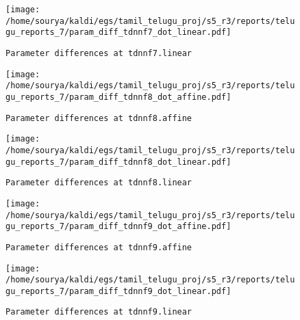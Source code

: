 \documentclass[prl,10pt,twocolumn]{revtex4}
\begin{document}
\newpage
\begin{figure}[h]
  \begin{center}
    \caption{\texttt{Parameter differences at tdnnf7.linear}}
    \texttt{[image: /home/sourya/kaldi/egs/tamil\_telugu\_proj/s5\_r3/reports/telugu\_reports\_7/param\_diff\_tdnnf7\_dot\_linear.pdf]}
  \end{center}
\end{figure}
\clearpage


\newpage
\begin{figure}[h]
  \begin{center}
    \caption{\texttt{Parameter differences at tdnnf8.affine}}
    \texttt{[image: /home/sourya/kaldi/egs/tamil\_telugu\_proj/s5\_r3/reports/telugu\_reports\_7/param\_diff\_tdnnf8\_dot\_affine.pdf]}
  \end{center}
\end{figure}
\clearpage


\newpage
\begin{figure}[h]
  \begin{center}
    \caption{\texttt{Parameter differences at tdnnf8.linear}}
    \texttt{[image: /home/sourya/kaldi/egs/tamil\_telugu\_proj/s5\_r3/reports/telugu\_reports\_7/param\_diff\_tdnnf8\_dot\_linear.pdf]}
  \end{center}
\end{figure}
\clearpage


\newpage
\begin{figure}[h]
  \begin{center}
    \caption{\texttt{Parameter differences at tdnnf9.affine}}
    \texttt{[image: /home/sourya/kaldi/egs/tamil\_telugu\_proj/s5\_r3/reports/telugu\_reports\_7/param\_diff\_tdnnf9\_dot\_affine.pdf]}
  \end{center}
\end{figure}
\clearpage


\newpage
\begin{figure}[h]
  \begin{center}
    \caption{\texttt{Parameter differences at tdnnf9.linear}}
    \texttt{[image: /home/sourya/kaldi/egs/tamil\_telugu\_proj/s5\_r3/reports/telugu\_reports\_7/param\_diff\_tdnnf9\_dot\_linear.pdf]}
  \end{center}
\end{figure}
\clearpage
\end{document}
